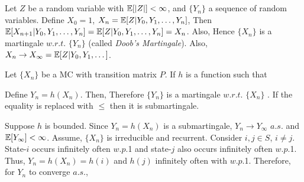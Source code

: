 \documentclass[all-lectures.tex]{subfiles}
\begin{document}

\setcounter{section}{5}
\setcounter{subsection}{1}

\section*{}
\begin{exmp}
Let $Z$ be a random variable with  $\mathbb{E}[|Z|] < \infty$, and  $\{Y_n\}$ a sequence of random variables. Define
$X_0=1$, $X_n = \mathbb{E}[Z|Y_0, Y_1, \dots, Y_n]$, Then $\mathbb{E}[X_{n+1}|Y_0, Y_1, \dots, Y_n] = \mathbb{E}[Z|Y_0, Y_1, \dots, Y_n] = X_n$. Also,
Hence $\{X_n\}$ is a martingale $w.r.t.$ $\{Y_n\}$ (called \textit{Doob's Martingale}).
Also, $X_n \to X_\infty = \mathbb{E}[Z|Y_0, Y_1, \dots]$.
\end{exmp}

\begin{exmp}
Let $\{X_n\}$ be a MC with transition matrix $P$.
If $h$ is a function such that 

Define $Y_n = h(X_n)$. Then,
Therefore $\{Y_n\}$ is a martingale $w.r.t.$ $\{X_n\}$ .
If the equality is replaced with $\le$ then it is submartingale.
\end{exmp}

Suppose $h$ is bounded. Since $Y_n = h(X_n)$ is a submartingale, $Y_n \to Y_\infty$ $a.s.$ and $\mathbb{E}[Y_\infty] < \infty$.
Assume, $\{X_n\}$ is irreducible and recurrent.
Consider $i, j \in S$, $i\neq j$. 
State-$i$ occurs infinitely often $w.p.$1 and state-$j$ also occurs infinitely often $w.p.$1.
Thus, 
$Y_n = h(X_n) = h(i)$ and $h(j)$ infinitely often with $w.p.$1.
Therefore, for $Y_n$ to converge $a.s.$,
\end{document}
